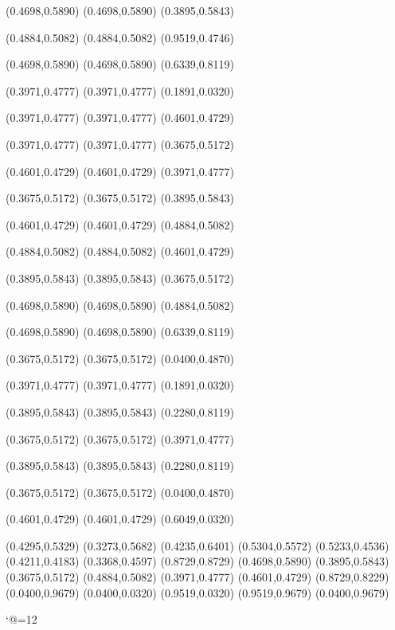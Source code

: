 \PST@Border(0.4698,0.5890)
(0.4698,0.5890)
(0.3895,0.5843)

\PST@Border(0.4884,0.5082)
(0.4884,0.5082)
(0.9519,0.4746)

\PST@Border(0.4698,0.5890)
(0.4698,0.5890)
(0.6339,0.8119)

\PST@Border(0.3971,0.4777)
(0.3971,0.4777)
(0.1891,0.0320)

\PST@Border(0.3971,0.4777)
(0.3971,0.4777)
(0.4601,0.4729)

\PST@Border(0.3971,0.4777)
(0.3971,0.4777)
(0.3675,0.5172)

\PST@Border(0.4601,0.4729)
(0.4601,0.4729)
(0.3971,0.4777)

\PST@Border(0.3675,0.5172)
(0.3675,0.5172)
(0.3895,0.5843)

\PST@Border(0.4601,0.4729)
(0.4601,0.4729)
(0.4884,0.5082)

\PST@Border(0.4884,0.5082)
(0.4884,0.5082)
(0.4601,0.4729)

\PST@Border(0.3895,0.5843)
(0.3895,0.5843)
(0.3675,0.5172)

\PST@Border(0.4698,0.5890)
(0.4698,0.5890)
(0.4884,0.5082)

\PST@Border(0.4698,0.5890)
(0.4698,0.5890)
(0.6339,0.8119)

\PST@Border(0.3675,0.5172)
(0.3675,0.5172)
(0.0400,0.4870)

\PST@Border(0.3971,0.4777)
(0.3971,0.4777)
(0.1891,0.0320)

\PST@Border(0.3895,0.5843)
(0.3895,0.5843)
(0.2280,0.8119)

\PST@Border(0.3675,0.5172)
(0.3675,0.5172)
(0.3971,0.4777)

\PST@Border(0.3895,0.5843)
(0.3895,0.5843)
(0.2280,0.8119)

\PST@Border(0.3675,0.5172)
(0.3675,0.5172)
(0.0400,0.4870)

\PST@Border(0.4601,0.4729)
(0.4601,0.4729)
(0.6049,0.0320)

\PST@Fillcircle(0.4295,0.5329)
\PST@Fillcircle(0.3273,0.5682)
\PST@Fillcircle(0.4235,0.6401)
\PST@Fillcircle(0.5304,0.5572)
\PST@Fillcircle(0.5233,0.4536)
\PST@Fillcircle(0.4211,0.4183)
\PST@Fillcircle(0.3368,0.4597)
\PST@Fillcircle(0.8729,0.8729)
\PST@Circle(0.4698,0.5890)
\PST@Circle(0.3895,0.5843)
\PST@Circle(0.3675,0.5172)
\PST@Circle(0.4884,0.5082)
\PST@Circle(0.3971,0.4777)
\PST@Circle(0.4601,0.4729)
\PST@Circle(0.8729,0.8229)
\PST@Border(0.0400,0.9679)
(0.0400,0.0320)
(0.9519,0.0320)
(0.9519,0.9679)
(0.0400,0.9679)

\catcode`@=12
\fi
\endpspicture